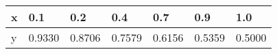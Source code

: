 \documentclass{article}
\begin{document}
\begin{table}[h!]
\begin{tabular}{l|l|l|l|l|l|l}

\multicolumn{1}{p{30.865313pt}}{\raggedright x} & \multicolumn{1}{|p{31.618126pt}}{\raggedright 0.1} & \multicolumn{1}{|p{31.618126pt}}{\raggedright 0.2} & \multicolumn{1}{|p{33.876564pt}}{\raggedright 0.4} & \multicolumn{1}{|p{37.640625pt}}{\raggedright 0.7} & \multicolumn{1}{|p{33.876564pt}}{\raggedright 0.9} & \multicolumn{1}{|p{33.876564pt}}{\raggedright 1.0}\\ 
\hline 
\multicolumn{1}{p{30.865313pt}}{\raggedright y} & \multicolumn{1}{|p{31.618126pt}}{\raggedright 0.9330} & \multicolumn{1}{|p{31.618126pt}}{\raggedright 0.8706} & \multicolumn{1}{|p{33.876564pt}}{\raggedright 0.7579} & \multicolumn{1}{|p{37.640625pt}}{\raggedright 0.6156} & \multicolumn{1}{|p{33.876564pt}}{\raggedright 0.5359} & \multicolumn{1}{|p{33.876564pt}}{\raggedright 0.5000}\\ 


\end{tabular}
\end{table}
\end{document}
